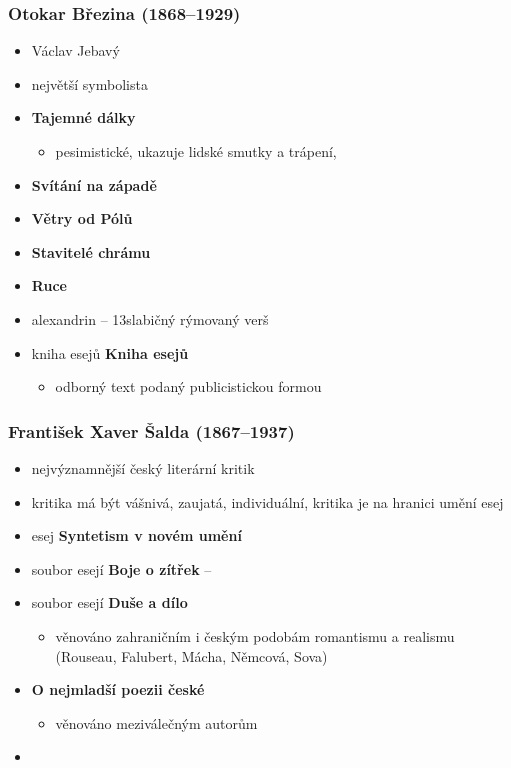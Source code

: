 \subsubsection{Otokar Březina (1868--1929)}
\begin{itemize}
\item Václav Jebavý
\item největší symbolista 
\item \textbf{Tajemné dálky}
	\begin{itemize}
	\item pesimistické, ukazuje lidské smutky a trápení, 
	\end{itemize}
\item \textbf{Svítání na západě}
\item \textbf{Větry od Pólů}
\item \textbf{Stavitelé chrámu}
\item \textbf{Ruce}

\item alexandrin -- 13slabičný rýmovaný verš
\item kniha esejů \textbf{Kniha esejů}
	\begin{itemize}
	\item odborný text podaný publicistickou formou
	\end{itemize}
\end{itemize}

\subsubsection{František Xaver Šalda (1867--1937)}
\begin{itemize}
\item nejvýznamnější český literární kritik
\item kritika má být vášnivá, zaujatá, individuální, kritika je na hranici umění \ra esej
\item esej \textbf{Syntetism v novém umění}
\item soubor esejí \textbf{Boje o zítřek} -- 
\item soubor esejí \textbf{Duše a dílo}
	\begin{itemize}
	\item věnováno zahraničním i českým podobám romantismu a realismu (Rouseau, Falubert, Mácha, Němcová, Sova)
	\end{itemize}
\item \textbf{O nejmladší poezii české}
	\begin{itemize}
	\item věnováno meziválečným autorům
	\end{itemize}
\item 
\end{itemize}


